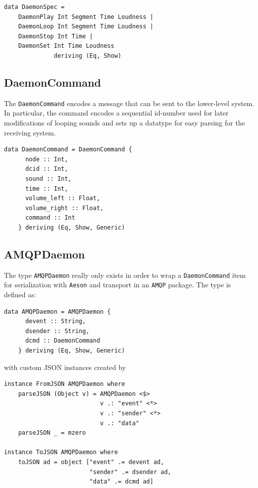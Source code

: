 \begin{verbatim}
data DaemonSpec = 
    DaemonPlay Int Segment Time Loudness |
    DaemonLoop Int Segment Time Loudness |
    DaemonStop Int Time |
    DaemonSet Int Time Loudness 
              deriving (Eq, Show)
\end{verbatim}

\subsection{DaemonCommand}
\label{sec:daemoncommand}

The \texttt{DaemonCommand} encodes a message that can be sent to the
lower-level system. In particular, the command encodes a sequential
id-number used for later modifications of looping sounds and sets up
a datatype for easy parsing for the receiving system.

\begin{verbatim}
data DaemonCommand = DaemonCommand {
      node :: Int,
      dcid :: Int,
      sound :: Int,
      time :: Int,
      volume_left :: Float,
      volume_right :: Float,
      command :: Int
    } deriving (Eq, Show, Generic)
\end{verbatim}

\subsection{AMQPDaemon}
\label{sec:amqpdaemon}

The type \texttt{AMQPDaemon} really only exists in order to wrap a
\texttt{DaemonCommand} item for serialization with \texttt{Aeson} and
transport in an \texttt{AMQP} package. The type is defined as:
\begin{verbatim}
data AMQPDaemon = AMQPDaemon {
      devent :: String,
      dsender :: String,
      dcmd :: DaemonCommand
    } deriving (Eq, Show, Generic)
\end{verbatim}
with custom JSON instances created by
\begin{verbatim}
instance FromJSON AMQPDaemon where
    parseJSON (Object v) = AMQPDaemon <$> 
                           v .: "event" <*>
                           v .: "sender" <*>
                           v .: "data"
    parseJSON _ = mzero

instance ToJSON AMQPDaemon where
    toJSON ad = object ["event" .= devent ad, 
                        "sender" .= dsender ad,
                        "data" .= dcmd ad]
\end{verbatim}

